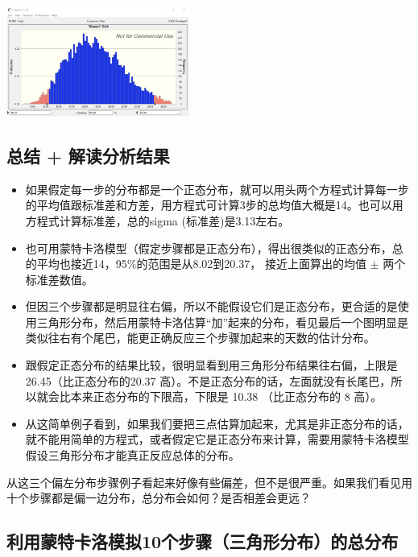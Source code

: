 \includegraphics[width=6cm]{pert32.png}

\hypertarget{ux603bux7ed3-ux89e3ux8bfbux5206ux6790ux7ed3ux679c}{%
\subsection{总结 +
解读分析结果}\label{ux603bux7ed3-ux89e3ux8bfbux5206ux6790ux7ed3ux679c}}

\begin{itemize}
\tightlist
\item
  如果假定每一步的分布都是一个正态分布，就可以用头两个方程式计算每一步的平均值跟标准差和方差，用方程式可计算3步的总均值大概是14。也可以用方程式计算标准差，总的sigma
  (标准差)是3.13左右。
\item
  也可用蒙特卡洛模型（假定步骤都是正态分布），得出很类似的正态分布，总的平均也接近14，95\%的范围是从8.02到20.37，
  接近上面算出的均值 \(\pm\) 两个标准差数值。
\item
  但因三个步骤都是明显往右偏，所以不能假设它们是正态分布，更合适的是使用三角形分布，然后用蒙特卡洛估算``加''起来的分布，看见最后一个图明显是类似往右有个尾巴，能更正确反应三个步骤加起来的天数的估计分布。
\item
  跟假定正态分布的结果比较，很明显看到用三角形分布结果往右偏，上限是
  26.45（比正态分布的20.37
  高）。不是正态分布的话，左面就没有长尾巴，所以就会比本来正态分布的下限高，下限是
  10.38 （比正态分布的 8 高）。
\item
  从这简单例子看到，如果我们要把三点估算加起来，尤其是非正态分布的话，就不能用简单的方程式，或者假定它是正态分布来计算，需要用蒙特卡洛模型假设三角形分布才能真正反应总体的分布。\\
\end{itemize}

从这三个偏左分布步骤例子看起来好像有些偏差，但不是很严重。如果我们看见用十个步骤都是偏一边分布，总分布会如何？是否相差会更远？

\hypertarget{ux5229ux7528ux8499ux7279ux5361ux6d1bux6a21ux62df10ux4e2aux6b65ux9aa4ux4e09ux89d2ux5f62ux5206ux5e03ux7684ux603bux5206ux5e03}{%
\subsection{利用蒙特卡洛模拟10个步骤（三角形分布）的总分布}\label{ux5229ux7528ux8499ux7279ux5361ux6d1bux6a21ux62df10ux4e2aux6b65ux9aa4ux4e09ux89d2ux5f62ux5206ux5e03ux7684ux603bux5206ux5e03}}

